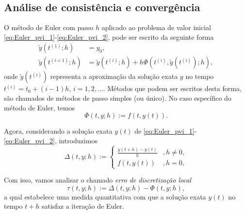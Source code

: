 \begin{ex}




\end{ex}

\subsection{Análise de consistência e convergência}

O método de Euler com passo $h$ aplicado ao problema de valor inicial \eqref{eq:Euler_pvi_1}-\eqref{eq:Euler_pvi_2}, pode ser escrito da seguinte forma
\begin{align}
  \tilde{y}(t^{(1)};h) &= y_0,\label{eq:MPS_1}\\
  \tilde{y}(t^{(i+1)};h) &= \tilde{y}(t^{(i)};h) + h\Phi(t^{(i)},\tilde{y}(t^{(i)});h),\label{eq:MPS_2}
\end{align}
onde $\tilde{y}(t^{(i)})$ representa a aproximação da solução exata $y$ no tempo $t^{(i)}=t_0+(i-1)h$, $i=1, 2, \ldots$. Métodos que podem ser escritos desta forma, são chamados de métodos de passo simples (ou único). No caso específico do método de Euler, temos
\begin{equation}
  \Phi(t,y;h) := f(t,y(t)).
\end{equation}

Agora, considerando a solução exata $y(t)$ de \eqref{eq:Euler_pvi_1}-\eqref{eq:Euler_pvi_2}, introduzimos
\begin{equation}
  \Delta(t,y;h) := \left\{
    \begin{array}{ll}
      \frac{y(t+h)-y(t)}{h} &, h\neq 0,\\
      f(t,y(t)) &, h=0,
    \end{array}\right.
\end{equation}

Com isso, vamos analisar o chamado \emph{erro de discretização local}
\begin{equation}
  \tau(t,y;h) := \Delta(t,y;h) - \Phi(t,y;h),
\end{equation}
a qual estabelece uma medida quantitativa com que a solução exata $y(t)$ no tempo $t+h$ satisfaz a iteração de Euler.

